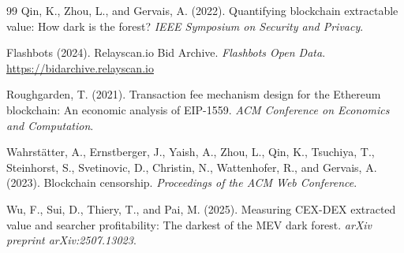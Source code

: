 \documentclass[11pt]{article}
\begin{document}
\begin{thebibliography}{99}
Qin, K., Zhou, L., and Gervais, A. (2022).
Quantifying blockchain extractable value: How dark is the forest?
\textit{IEEE Symposium on Security and Privacy}.

Flashbots (2024).
Relayscan.io Bid Archive.
\textit{Flashbots Open Data}.
\url{https://bidarchive.relayscan.io}

Roughgarden, T. (2021).
Transaction fee mechanism design for the Ethereum blockchain: An economic
analysis of EIP-1559.
\textit{ACM Conference on Economics and Computation}.

Wahrst\"atter, A., Ernstberger, J., Yaish, A., Zhou, L., Qin, K.,
Tsuchiya, T., Steinhorst, S., Svetinovic, D., Christin, N., Wattenhofer, R.,
and Gervais, A. (2023).
Blockchain censorship.
\textit{Proceedings of the ACM Web Conference}.

Wu, F., Sui, D., Thiery, T., and Pai, M. (2025).
Measuring CEX-DEX extracted value and searcher profitability: The darkest of
the MEV dark forest.
\textit{arXiv preprint arXiv:2507.13023}.

\end{thebibliography}
\end{document}
